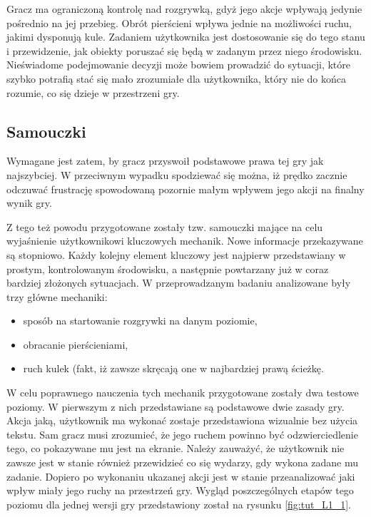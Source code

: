 \documentclass[a4paper,12pt,numbers=noenddot]{report}
\begin{document}
Gracz ma ograniczoną kontrolę nad rozgrywką, gdyż jego akcje wpływają jedynie pośrednio na jej przebieg. Obrót pierścieni wpływa jednie na możliwości ruchu, jakimi dysponują kule. Zadaniem użytkownika jest dostosowanie się do tego stanu i przewidzenie, jak obiekty poruszać się będą w zadanym przez niego środowisku. Nieświadome podejmowanie decyzji może bowiem prowadzić do sytuacji, które szybko potrafią stać się mało zrozumiałe dla użytkownika, który nie do końca rozumie, co się dzieje w przestrzeni gry.

	\subsection{Samouczki}
Wymagane jest zatem, by gracz przyswoił podstawowe prawa tej gry jak najszybciej. W przeciwnym wypadku spodziewać się można, iż prędko zacznie odczuwać frustrację spowodowaną pozornie małym wpływem jego akcji na finalny wynik gry. 

Z tego też powodu przygotowane zostały tzw. samouczki mające na celu wyjaśnienie użytkownikowi kluczowych mechanik. Nowe informacje przekazywane są stopniowo. Każdy kolejny element kluczowy jest najpierw przedstawiany w prostym, kontrolowanym środowisku, a następnie powtarzany już w coraz bardziej złożonych sytuacjach. 
W przeprowadzanym badaniu analizowane były trzy główne mechaniki: 
\begin{itemize}
\item sposób na startowanie rozgrywki na danym poziomie, 
\item obracanie pierścieniami,
\item ruch kulek (fakt, iż zawsze skręcają one w najbardziej prawą ścieżkę.
\end{itemize}

W celu poprawnego nauczenia tych mechanik przygotowane zostały dwa testowe poziomy. W pierwszym z nich przedstawiane są podstawowe dwie zasady gry. Akcja jaką, użytkownik ma wykonać zostaje przedstawiona wizualnie bez użycia tekstu. Sam gracz musi zrozumieć, że jego ruchem powinno być odzwierciedlenie tego, co pokazywane mu jest na ekranie. Należy zauważyć, że użytkownik nie zawsze jest w stanie również przewidzieć co się wydarzy, gdy wykona zadane mu zadanie. Dopiero po wykonaniu ukazanej akcji jest w stanie przeanalizować jaki wpływ miały jego ruchy na przestrzeń gry.
Wygląd poszczególnych etapów tego poziomu dla jednej wersji gry przedstawiony został na rysunku \ref{fig:tut_L1_1}.
\end{document}
